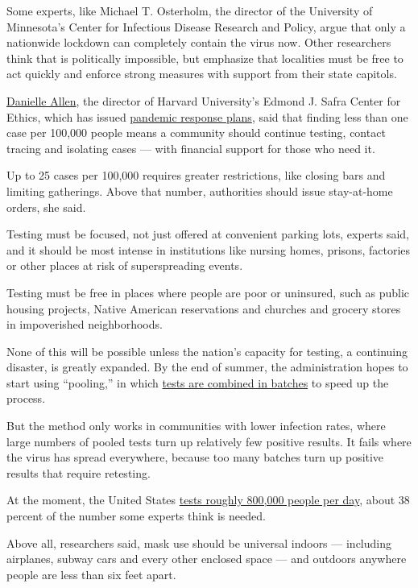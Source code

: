 Some experts, like Michael T. Osterholm, the director of the University
of Minnesota's Center for Infectious Disease Research and Policy, argue
that only a nationwide lockdown can completely contain the virus now.
Other researchers think that is politically impossible, but emphasize
that localities must be free to act quickly and enforce strong measures
with support from their state capitols.

\href{https://scholar.harvard.edu/danielleallen/home}{Danielle Allen},
the director of Harvard University's Edmond J. Safra Center for Ethics,
which has issued
\href{https://ethics.harvard.edu/news/path-zero-key-metrics}{pandemic
response plans}, said that finding less than one case per 100,000 people
means a community should continue testing, contact tracing and isolating
cases --- with financial support for those who need it.

Up to 25 cases per 100,000 requires greater restrictions, like closing
bars and limiting gatherings. Above that number, authorities should
issue stay-at-home orders, she said.

Testing must be focused, not just offered at convenient parking lots,
experts said, and it should be most intense in institutions like nursing
homes, prisons, factories or other places at risk of superspreading
events.

Testing must be free in places where people are poor or uninsured, such
as public housing projects, Native American reservations and churches
and grocery stores in impoverished neighborhoods.

None of this will be possible unless the nation's capacity for testing,
a continuing disaster, is greatly expanded. By the end of summer, the
administration hopes to start using ``pooling,'' in which
\href{https://www.nytimes3xbfgragh.onion/2020/07/01/health/coronavirus-pooled-testing.html}{tests
are combined in batches} to speed up the process.

But the method only works in communities with lower infection rates,
where large numbers of pooled tests turn up relatively few positive
results. It fails where the virus has spread everywhere, because too
many batches turn up positive results that require retesting.

At the moment, the United States
\href{https://www.nytimes3xbfgragh.onion/interactive/2020/us/coronavirus-testing.html}{tests
roughly 800,000 people per day}, about 38 percent of the number some
experts think is needed.

Above all, researchers said, mask use should be universal indoors ---
including airplanes, subway cars and every other enclosed space --- and
outdoors anywhere people are less than six feet apart.

